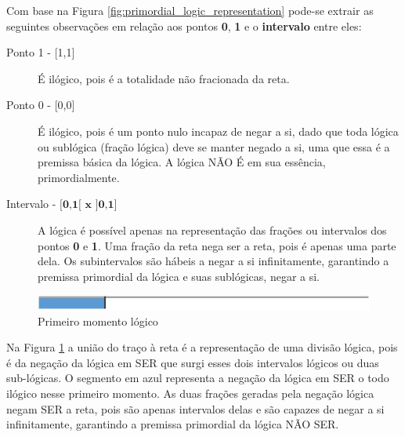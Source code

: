 Com base na Figura \ref{fig:primordial_logic_representation} pode-se extrair as seguintes observações em relação aos pontos \textbf{0}, \textbf{1} e o \textbf{intervalo} entre eles:
\begin{description}
   \item[Ponto 1 - {[1,1]}] É ilógico, pois é a totalidade não fracionada da reta.
   \item[Ponto 0 - {[0,0]}] É ilógico, pois é um ponto nulo incapaz de negar a si, dado que toda lógica ou sublógica (fração lógica) deve se manter negado a si, uma que essa é a premissa básica da lógica. A lógica NÃO É em sua essência, primordialmente.
   \item[Intervalo - $\textbf{{[0,1[ x ]0,1]}}$] A lógica é possível apenas na representação das frações ou intervalos dos pontos \textbf{0} e \textbf{1}. Uma fração da reta nega ser a reta, pois é apenas uma parte dela. Os subintervalos são hábeis a negar a si infinitamente, garantindo a premissa primordial da lógica e suas sublógicas, negar a si. 
\end{description}

\begin{figure}[H]
\caption{Primeiro momento lógico}
\label{fig:first_logical_moment}
\centering
\includegraphics[scale=1]{sections/images/first_logical_moment.jpg}
\end{figure}

Na Figura \ref{fig:first_logical_moment} a união do traço à reta é a representação de uma divisão lógica, pois é da negação da lógica em SER que surgi esses dois intervalos lógicos ou duas sub-lógicas. O segmento em azul representa a negação da lógica em SER o todo ilógico nesse primeiro momento. As duas frações geradas pela negação lógica negam SER a reta, pois são apenas intervalos delas e são capazes de negar a si infinitamente, garantindo a premissa primordial da lógica NÃO SER. 








